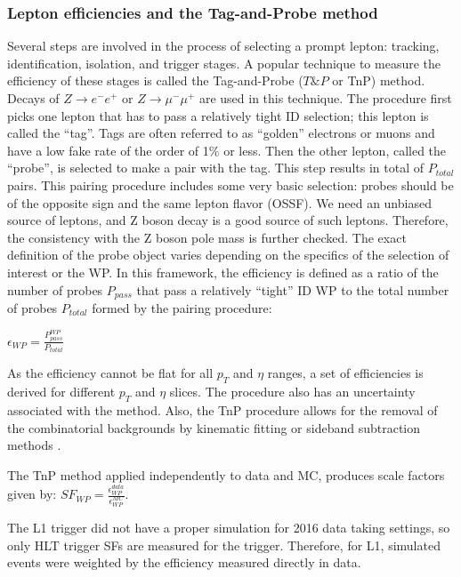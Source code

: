 \subsubsection{Lepton efficiencies and the Tag-and-Probe method}\label{sec:TnP}

Several steps are involved in the process of selecting a prompt lepton: tracking, identification, isolation, and trigger stages. A popular technique to measure the efficiency of these stages is called the Tag-and-Probe ($T\&P$ or TnP) method. Decays of $Z \rightarrow e^- e^+$ or $Z \rightarrow \mu^- \mu^+$ are used in this technique. The procedure first picks one lepton that has to pass a relatively tight ID selection; this lepton is called the ``tag''. Tags are often referred to as ``golden'' electrons or muons and have a low fake rate of the order of 1$\%$ or less. Then the other lepton, called the ``probe'', is selected to make a pair with the tag. This step results in total of $P_{total}$ pairs. This pairing procedure includes some very basic selection:  probes should be of the opposite sign and the same lepton flavor (OSSF). We need an unbiased source of leptons, and Z boson decay is a good source of such leptons. Therefore, the consistency with the Z boson pole mass is further checked. The exact definition of the probe object varies depending on the specifics of the selection of interest or the WP. In this framework, the efficiency is defined as a ratio of the number of probes $P_{pass}$ that pass a relatively ``tight'' ID WP to the total number of probes $P_{total}$ formed by the pairing procedure:

$\epsilon_{WP} = \frac{P^{WP} _{pass}}{P_{total}} $

As the efficiency cannot be flat for all $p_T$ and $\eta$ ranges, a set of efficiencies is derived for different $p_T$ and $\eta$ slices. The procedure also has an uncertainty associated with the method. Also, the TnP procedure allows for the removal of the combinatorial backgrounds by kinematic fitting or sideband subtraction methods \cite{TnP}. 

The TnP method applied independently to data and MC, produces scale factors given by:
$SF_{WP} = \frac{\epsilon^{data}_{WP}}{\epsilon^{MC}_{WP}}$.

The L1 trigger did not have a proper simulation for 2016 data taking settings, so only HLT trigger SFs are measured for the trigger. Therefore, for L1, simulated events were weighted by the efficiency measured directly in data. 


